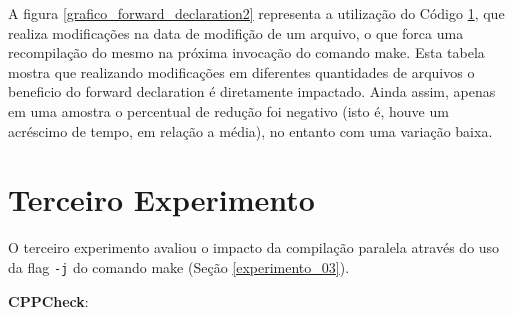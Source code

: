 A figura \ref{grafico_forward_declaration2} representa a utilização do Código \ref{},
 que realiza modificações na data de modifição de um arquivo, o que forca uma
 recompilação do mesmo na próxima invocação do comando make.
 Esta tabela mostra que realizando modificações em diferentes
 quantidades de arquivos o beneficio do forward declaration é
 diretamente impactado. Ainda assim, apenas em uma amostra o percentual
 de redução foi negativo  (isto é, houve um acréscimo de tempo,
 em relação a média), no entanto com uma variação baixa.



\section{Terceiro Experimento}

O terceiro experimento avaliou o impacto da compilação
 paralela através do uso da flag \texttt{-j} do
 comando make (Seção \ref{experimento_03}).



\textbf{CPPCheck}:


